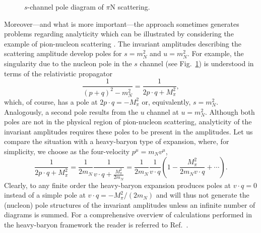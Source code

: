 \documentclass[twoside,12pt]{article}
\begin{document}
\begin{figure}[t]
\begin{center}
\caption{$s$-channel pole diagram of $\pi$N scattering.}
\label{4:3:1:fig:schannel}
\end{center}
\end{figure}
   Moreover---and what is more important---the approach sometimes generates problems
regarding analyticity which can be illustrated by considering the example of
pion-nucleon scattering \cite{Becher:2000mb}.
   The invariant amplitudes describing the scattering amplitude develop
poles for $s=m_N^2$ and $u=m_N^2$.
   For example, the singularity due to the nucleon pole in the $s$ channel
(see Fig.\ \ref{4:3:1:fig:schannel}) is understood in terms of the relativistic
propagator
\begin{equation}
\label{relprop}
\frac{1}{(p+q)^2-m_N^2}=\frac{1}{2p\cdot q+M_\pi^2},
\end{equation}
which, of course, has a pole at $2p\cdot q=-M_\pi^2$ or, equivalently,
$s=m_N^2$.
  Analogously, a second pole results from the $u$ channel at $u=m_N^2$.
  Although both poles are not in the physical region of pion-nucleon
scattering, analyticity of the invariant amplitudes requires these poles
to be present in the amplitudes.
   Let us compare the situation with a heavy-baryon type of expansion,
where, for simplicity, we choose as the four-velocity $p^\mu=m_N v^\mu$,
\begin{equation}
\label{4:3:1:relpropv}
\frac{1}{2p\cdot q+M_\pi^2}=
\frac{1}{2m_N}\frac{1}{v\cdot q+ \frac{M_\pi^2}{2m_N}}
=\frac{1}{2 m_N}\frac{1}{v\cdot q}\left(1-\frac{M_\pi^2}{2 m_N v\cdot q}
+\cdots\right).
\end{equation}
   Clearly, to any finite order the heavy-baryon expansion produces poles
at $v\cdot q=0$ instead of a simple pole at $v\cdot q=-M_\pi^2/(2 m_N)$ and
will thus not generate the (nucleon) pole structures of the invariant
amplitudes unless an infinite number of diagrams is summed.
   For a comprehensive overview of calculations performed in the heavy-baryon
framework the reader is referred to Ref.\ \cite{Bernard:1995dp}.
\end{document}
